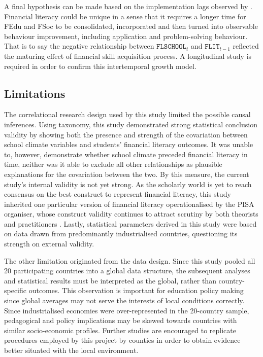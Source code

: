 A final hypothesis can be made based on the implementation lags observed by \citet{bernheim:2001}. Financial literacy could be unique in a sense that it requires a longer time for FEdu and FSoc to be consolidated, incorporated and then turned into observable behaviour improvement, including application and problem-solving behaviour. That is to say the negative relationship between $\texttt{FLSCHOOL}_t$ and $\texttt{FLIT}_{t-1}$ reflected the maturing effect of financial skill acquisition process. A longitudinal study is required in order to confirm this intertemporal growth model.

\subsection{Limitations}

The correlational research design used by this study limited the possible causal inferences. Using  taxonomy, this study demonstrated strong statistical conclusion validity by showing both the presence and strength of the covariation between school climate variables and students' financial literacy outcomes. It was unable to, however, demonstrate whether school climate preceded financial literacy in time, neither was it able to exclude all other relationships as plausible explanations for the covariation between the two. By this measure, the current study's internal validity is not yet strong. As the scholarly world is yet to reach consensus on the best construct to represent financial literacy, this study inherited one particular version of financial literacy operationalised by the PISA organiser, whose construct validity continues to attract scrutiny by both theorists and practitioners \citep{schuhen:2014}. Lastly, statistical parameters derived in this study were based on data drawn from predominantly industrialised countries, questioning its strength on external validity.

The other limitation originated from the data design. Since this study pooled all 20 participating countries into a global data structure, the subsequent analyses and statistical results must be interpreted as the global, rather than country-specific outcomes. This observation is important for education policy making since global averages may not serve the interests of local conditions correctly. Since industrialised economies were over-represented in the 20-country sample, pedagogical and policy implications may be skewed towards countries with similar socio-economic profiles. Further studies are encouraged to replicate procedures employed by this project by counties in order to obtain evidence better situated with the local environment.

